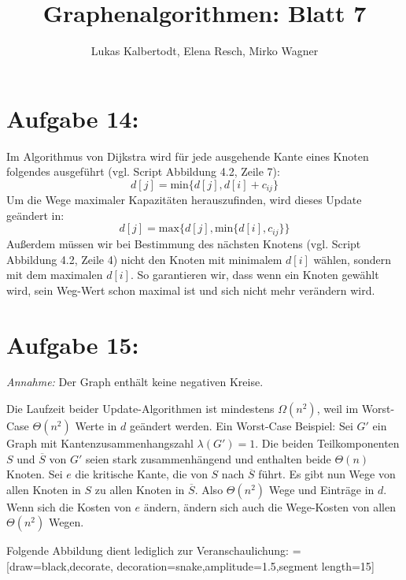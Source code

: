 \documentclass[11pt]{scrartcl} %
\title{Graphenalgorithmen: Blatt 7}
\author{Lukas Kalbertodt, Elena Resch, Mirko Wagner}
\begin{document}
\maketitle


\section*{Aufgabe 14:}

Im Algorithmus von Dijkstra wird für jede ausgehende Kante eines Knoten folgendes ausgeführt (vgl. Script Abbildung 4.2, Zeile 7):
\[d[j] = \text{min}\{d[j], d[i] + c_{ij}\}\]
Um die Wege maximaler Kapazitäten herauszufinden, wird dieses Update geändert in:
\[d[j] = \text{max}\{d[j], \text{min}\{d[i], c_{ij}\}\}\]
Außerdem müssen wir bei Bestimmung des nächsten Knotens (vgl. Script Abbildung 4.2, Zeile 4) nicht den Knoten mit minimalem $d[i]$ wählen, sondern mit dem maximalen $d[i]$. So garantieren wir, dass wenn ein Knoten gewählt wird, sein Weg-Wert schon maximal ist und sich nicht mehr verändern wird.

\section*{Aufgabe 15:}
\emph{Annahme:} Der Graph enthält keine negativen Kreise.

Die Laufzeit beider Update-Algorithmen ist mindestens $\Omega (n^2)$, weil im Worst-Case $\Theta (n^2)$ Werte in $d$ geändert werden. Ein Worst-Case Beispiel: Sei $G'$ ein Graph mit Kantenzusammenhangszahl $\lambda(G') = 1$. Die beiden Teilkomponenten $S$ und $\overline{S}$ von $G'$ seien stark zusammenhängend und enthalten beide $\Theta (n)$ Knoten. Sei $e$ die kritische Kante, die von $S$ nach $\overline{S}$ führt. Es gibt nun Wege von allen Knoten in $S$ zu allen Knoten in $\overline{S}$. Also $\Theta (n^2)$ Wege und Einträge in $d$. Wenn sich die Kosten von $e$ ändern, ändern sich auch die Wege-Kosten von allen $\Theta (n^2)$ Wegen.

\newpage
Folgende Abbildung dient lediglich zur Veranschaulichung:
 = [draw=black,decorate, decoration={snake,amplitude=1.5,segment length=15}]
\begin{center}
    \\[0.5cm]
\end{center}
\end{document}
